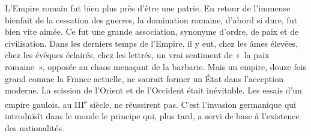 \documentclass[twoside]{book} %
\newcommand\orgName[1]{#1}
\newcommand\placeName[1]{#1}
\begin{document}
L’{\orgName Empire romain} fut bien plus près d’être une patrie. En retour de l’immense bienfait de la cessation des guerres, la domination romaine, d’abord si dure, fut bien vite aimée. Ce fut une grande association, synonyme d’ordre, de paix et de civilisation. Dans les derniers temps de l’{\orgName Empire}, il y eut, chez les âmes élevées, chez les évêques éclairés, chez les lettrés, un vrai sentiment de « la paix romaine », opposée au chaos menaçant de la barbarie. Mais un empire, douze fois grand comme la {\placeName France} actuelle, ne saurait former un État dans l’acception moderne. La scission de l’{\placeName Orient} et de l’{\placeName Occident} était inévitable. Les essais d’un {\orgName empire gaulois}, au III\textsuperscript{e} siècle, ne réussirent pas. C’est l’invasion germanique qui introduisît dans le monde le principe qui, plus tard, a servi de base à l’existence des nationalités.\par
\end{document}
